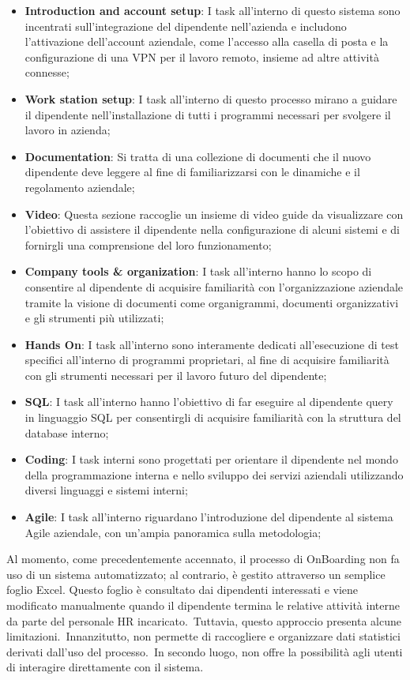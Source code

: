 \begin{itemize}
    \item \textbf{Introduction and account setup}: I task all'interno di questo sistema sono incentrati sull'integrazione del dipendente 
    nell'azienda e includono l'attivazione dell'account aziendale, come l'accesso alla casella di posta e la configurazione di una VPN per 
    il lavoro remoto, insieme ad altre attività connesse;
    \item \textbf{Work station setup}: I task all'interno di questo processo mirano a guidare il dipendente nell'installazione di tutti 
    i programmi necessari per svolgere il lavoro in azienda;
    \item \textbf{Documentation}: Si tratta di una collezione di documenti che il nuovo dipendente deve leggere al fine di familiarizzarsi 
    con le dinamiche e il regolamento aziendale;
    \item \textbf{Video}: Questa sezione raccoglie un insieme di video guide da visualizzare con l'obiettivo di assistere il dipendente 
    nella configurazione di alcuni sistemi e di fornirgli una comprensione del loro funzionamento;
    \item \textbf{Company tools \& organization}: I task all'interno hanno lo scopo di consentire al dipendente di acquisire familiarità con 
    l'organizzazione aziendale tramite la visione di documenti come organigrammi, documenti organizzativi e gli strumenti più utilizzati;
    \item \textbf{Hands On}: I task all'interno sono interamente dedicati all'esecuzione di test specifici all'interno di programmi 
    proprietari, al fine di acquisire familiarità con gli strumenti necessari per il lavoro futuro del dipendente;
    \item \textbf{SQL}: I task all'interno hanno l'obiettivo di far eseguire al dipendente query in linguaggio SQL per 
    consentirgli di acquisire familiarità con la struttura del database interno;
    \item \textbf{Coding}: I task interni sono progettati per orientare il dipendente nel mondo della programmazione interna 
    e nello sviluppo dei servizi aziendali utilizzando diversi linguaggi e sistemi interni;
    \item \textbf{Agile}: I task all'interno riguardano l'introduzione del dipendente al sistema Agile aziendale, 
    con un'ampia panoramica sulla metodologia; 
\end{itemize}
%
Al momento, come precedentemente accennato, il processo di OnBoarding non fa uso di un sistema automatizzato; 
al contrario, è gestito attraverso un semplice foglio Excel. Questo foglio è consultato dai dipendenti interessati 
e viene modificato manualmente quando il dipendente termina le relative attività interne da parte del personale HR incaricato.\ 
Tuttavia, questo approccio presenta alcune limitazioni.\ 
Innanzitutto, non permette di raccogliere e organizzare dati statistici derivati dall'uso del processo.\ 
In secondo luogo, non offre la possibilità agli utenti di interagire direttamente con il sistema.

